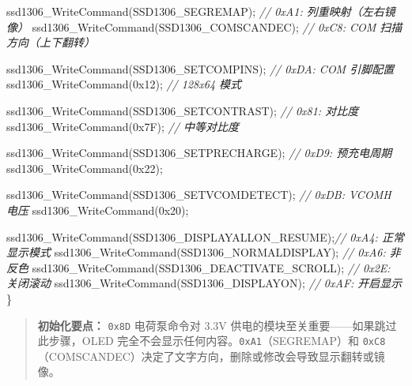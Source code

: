 \documentclass[
  chinese,
  UTF8,
  oneside,
  openany]{ctexbook}
\newenvironment{Shaded}{}{}
\newcommand{\BaseNTok}[1]{\textcolor[rgb]{0.25,0.63,0.44}{#1}}
\newcommand{\CommentTok}[1]{\textcolor[rgb]{0.38,0.63,0.69}{\textit{#1}}}
\newcommand{\NormalTok}[1]{#1}
\newcommand{\OperatorTok}[1]{\textcolor[rgb]{0.40,0.40,0.40}{#1}}
\begin{document}
\begin{Shaded}
\begin{Highlighting}[]
\NormalTok{    ssd1306\_WriteCommand}\OperatorTok{(}\NormalTok{SSD1306\_SEGREMAP}\OperatorTok{);}          \CommentTok{// 0xA1: 列重映射（左右镜像）}
\NormalTok{    ssd1306\_WriteCommand}\OperatorTok{(}\NormalTok{SSD1306\_COMSCANDEC}\OperatorTok{);}        \CommentTok{// 0xC8: COM 扫描方向（上下翻转）}

\NormalTok{    ssd1306\_WriteCommand}\OperatorTok{(}\NormalTok{SSD1306\_SETCOMPINS}\OperatorTok{);}        \CommentTok{// 0xDA: COM 引脚配置}
\NormalTok{    ssd1306\_WriteCommand}\OperatorTok{(}\BaseNTok{0x12}\OperatorTok{);}                      \CommentTok{// 128x64 模式}

\NormalTok{    ssd1306\_WriteCommand}\OperatorTok{(}\NormalTok{SSD1306\_SETCONTRAST}\OperatorTok{);}       \CommentTok{// 0x81: 对比度}
\NormalTok{    ssd1306\_WriteCommand}\OperatorTok{(}\BaseNTok{0x7F}\OperatorTok{);}                      \CommentTok{// 中等对比度}

\NormalTok{    ssd1306\_WriteCommand}\OperatorTok{(}\NormalTok{SSD1306\_SETPRECHARGE}\OperatorTok{);}      \CommentTok{// 0xD9: 预充电周期}
\NormalTok{    ssd1306\_WriteCommand}\OperatorTok{(}\BaseNTok{0x22}\OperatorTok{);}

\NormalTok{    ssd1306\_WriteCommand}\OperatorTok{(}\NormalTok{SSD1306\_SETVCOMDETECT}\OperatorTok{);}     \CommentTok{// 0xDB: VCOMH 电压}
\NormalTok{    ssd1306\_WriteCommand}\OperatorTok{(}\BaseNTok{0x20}\OperatorTok{);}

\NormalTok{    ssd1306\_WriteCommand}\OperatorTok{(}\NormalTok{SSD1306\_DISPLAYALLON\_RESUME}\OperatorTok{);}\CommentTok{// 0xA4: 正常显示模式}
\NormalTok{    ssd1306\_WriteCommand}\OperatorTok{(}\NormalTok{SSD1306\_NORMALDISPLAY}\OperatorTok{);}      \CommentTok{// 0xA6: 非反色}
\NormalTok{    ssd1306\_WriteCommand}\OperatorTok{(}\NormalTok{SSD1306\_DEACTIVATE\_SCROLL}\OperatorTok{);}  \CommentTok{// 0x2E: 关闭滚动}
\NormalTok{    ssd1306\_WriteCommand}\OperatorTok{(}\NormalTok{SSD1306\_DISPLAYON}\OperatorTok{);}          \CommentTok{// 0xAF: 开启显示}
\OperatorTok{\}}
\end{Highlighting}
\end{Shaded}

\begin{quote}
\textbf{初始化要点：} \texttt{0x8D} 电荷泵命令对 3.3V
供电的模块至关重要------如果跳过此步骤，OLED
完全不会显示任何内容。\texttt{0xA1}（SEGREMAP）和
\texttt{0xC8}（COMSCANDEC）决定了文字方向，删除或修改会导致显示翻转或镜像。
\end{quote}
\end{document}
